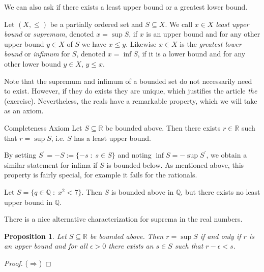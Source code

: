 \documentclass [aspectratio=169, handout]{beamer}
\newcommand{\R}{{\mathbb{R}}}
\newcommand{\Q}{{\mathbb{Q}}}
\newtheorem{proposition}[theorem]{Proposition}
\begin{document}
\begin{frame}

We can also ask if there exists a least upper bound or a greatest lower bound. 

\begin{definition}%
Let $(X,\leq)$ be a partially ordered set and $S\subseteq X$. We call $x\in X$ \emph{least upper bound} or \emph{supremum}, denoted $x= \sup S$, if $x$ is an upper bound and for any other upper bound $y\in X$ of $S$ we have $x\leq y$. Likewise $x\in X$ is the \emph{greatest lower bound} or \emph{infimum} for $S$, denoted $x= \inf S$, if it is a lower bound and for any other lower bound $y\in X$, $y\leq x$.
\end{definition}
\end{frame}

\begin{frame}
Note that the supremum and infimum of a bounded set do not necessarily need to exist. However, if they do exists they are unique, which justifies the article \emph{the} (exercise). Nevertheless, the reals have a remarkable property, which we will take as an axiom.

\begin{alertblock}{Completeness Axiom}
Let $S\subseteq \R$ be bounded above. Then there exists $r\in \R$ such that $r= \sup S$, i.e. $S$ has a least upper bound. 
\end{alertblock}

By setting $S^\prime = -S:= \{ -s \; \colon \; s\in S\}$ and noting $\inf S = - \sup S^\prime$, we obtain a similar statement for infima if $S$ is bounded below. As mentioned above, this property is fairly special, for example it fails for the rationals.

\begin{example}
Let $S= \{q \in \Q \; \colon \; x^2 < 7 \}$. Then $S$ is bounded above in $\Q$, but there exists no least upper bound in $\Q$.
\end{example}



\end{frame}

\begin{frame}
There is a nice alternative characterization for suprema in the real numbers. 

\begin{proposition}
 Let $S\subseteq \R$ be bounded above. Then $r= \sup S$ if and only if $r$ is an upper bound and for all $\epsilon>0$ there exists an $s\in S$ such that $r-\epsilon <s$. 
\end{proposition}

\begin{proof}
($\Rightarrow$) 
\vspace{3cm}
\end{proof}
\end{frame}
\end{document}
